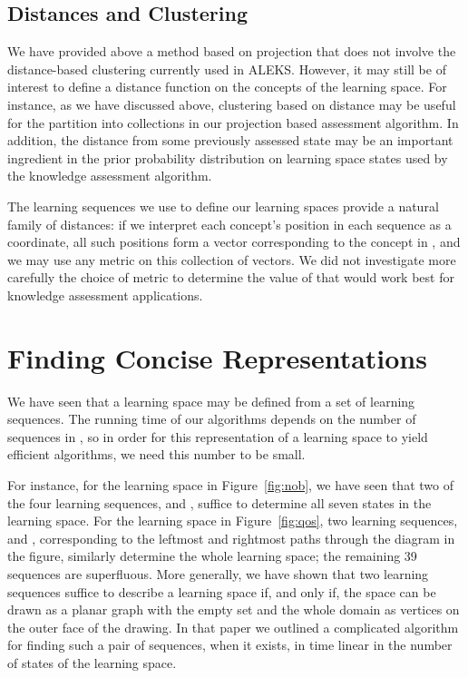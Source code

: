 \documentclass[11pt]{llncs}
\begin{document}
{\subsection{Distances and Clustering}

We have provided above a method based on projection that does not involve the distance-based clustering currently used in ALEKS. However, it may still be of interest to define a distance function on the concepts of the learning space. For instance, as we have discussed above, clustering based on distance may be useful for the partition into collections  in our projection based assessment algorithm. In addition, the distance from some previously assessed state may be an important ingredient in the prior probability distribution on learning space states used by the knowledge assessment algorithm.

The learning sequences we use to define our learning spaces provide a natural family of distances:
if we interpret each concept's position in each sequence as a coordinate, all such positions form a vector corresponding to the concept in , and we may use any  metric on this collection of vectors. We did not investigate more carefully the choice of metric to determine the value of  that would work best for knowledge assessment applications.

\section{Finding Concise Representations}

We have seen that a learning space may be defined from a set  of learning sequences.
The running time of our algorithms depends on the number of sequences in , so in order for this representation of a learning space to yield efficient algorithms, we need this number to be small.

For instance, for the learning space in Figure~\ref{fig:nob}, we have seen that two of the four learning sequences,  and , suffice to determine all seven states in the learning space.
For the learning space in Figure~\ref{fig:qos}, two learning sequences, 
 and , corresponding to the leftmost and rightmost paths through the diagram in the figure, similarly determine the whole learning space; the remaining 39 sequences are superfluous. More generally, we have shown \citep{eppst06} that two learning sequences suffice to describe a learning space if, and only if, the space can be drawn as a planar graph with the empty set and the whole domain as vertices on the outer face of the drawing. In that paper we outlined a complicated algorithm for finding such a pair of sequences, when it exists, in time linear in the number of states of the learning space.

}
\end{document}
